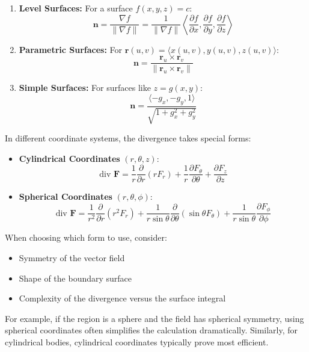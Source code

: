\begin{enumerate}
    \item \textbf{Level Surfaces:} For a surface $f(x,y,z) = c$:
    \[
    \mathbf{n} = \frac{\nabla f}{\|\nabla f\|} = \frac{1}{\|\nabla f\|}\left\langle\frac{\partial f}{\partial x}, \frac{\partial f}{\partial y}, \frac{\partial f}{\partial z}\right\rangle
    \]
    
    \item \textbf{Parametric Surfaces:} For $\mathbf{r}(u,v) = \langle x(u,v), y(u,v), z(u,v) \rangle$:
    \[
    \mathbf{n} = \frac{\mathbf{r}_u \times \mathbf{r}_v}{\|\mathbf{r}_u \times \mathbf{r}_v\|}
    \]
    
    \item \textbf{Simple Surfaces:} For surfaces like $z = g(x,y)$:
    \[
    \mathbf{n} = \frac{\langle-g_x, -g_y, 1\rangle}{\sqrt{1 + g_x^2 + g_y^2}}
    \]
\end{enumerate}

\noindent In different coordinate systems, the divergence takes special forms:

\begin{itemize}
    \item \textbf{Cylindrical Coordinates} $(r,\theta,z)$:
    \[
    \text{div }\mathbf{F} = \frac{1}{r}\frac{\partial}{\partial r}(rF_r) + \frac{1}{r}\frac{\partial F_\theta}{\partial \theta} + \frac{\partial F_z}{\partial z}
    \]
    
    \item \textbf{Spherical Coordinates} $(r,\theta,\phi)$:
    \[
    \text{div }\mathbf{F} = \frac{1}{r^2}\frac{\partial}{\partial r}(r^2F_r) + \frac{1}{r\sin\theta}\frac{\partial}{\partial \theta}(\sin\theta F_\theta) + \frac{1}{r\sin\theta}\frac{\partial F_\phi}{\partial \phi}
    \]
\end{itemize}

\noindent When choosing which form to use, consider:

\begin{itemize}
    \item Symmetry of the vector field
    \item Shape of the boundary surface
    \item Complexity of the divergence versus the surface integral
\end{itemize}

\noindent For example, if the region is a sphere and the field has spherical symmetry, using spherical coordinates often simplifies the calculation dramatically. Similarly, for cylindrical bodies, cylindrical coordinates typically prove most efficient. \\


